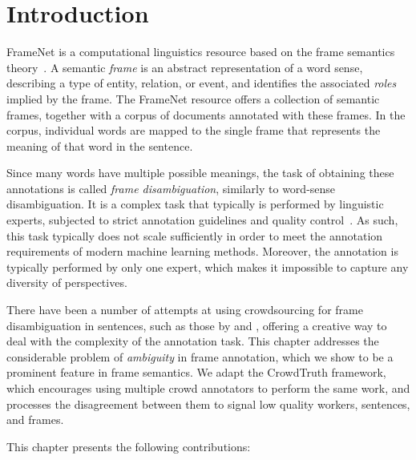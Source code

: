 \section{Introduction}

FrameNet is a computational linguistics resource based on the frame semantics theory~\cite{baker1998berkeley}. A semantic \textit{frame} is an abstract representation of a word sense, describing a type of entity, relation, or event, and identifies the associated \emph{roles} implied by the frame. The FrameNet resource offers a collection of semantic frames, together with a corpus of documents annotated with these frames. In the corpus, individual words are mapped to the single frame that represents the meaning of that word in the sentence.  

Since many words have multiple possible meanings, the task of obtaining these annotations is called \emph{frame disambiguation}, similarly to word-sense disambiguation.  It is a complex task that typically is performed by linguistic experts, subjected to strict annotation guidelines and quality control~\cite{baker2012framenet}. As such, this task typically does not scale sufficiently in order to meet the annotation requirements of modern machine learning methods. Moreover, the annotation is typically performed by only one expert, which makes it impossible to capture any diversity of perspectives.  

There have been a number of attempts at using crowdsourcing for frame disambiguation in sentences, such as those by \citet{Hong:2011:GCR:2018966.2018970} and \citet{chang2015scaling}, offering a creative way to deal with the complexity of the annotation task. This chapter addresses the considerable problem of \emph{ambiguity}  in frame annotation, which we show to be a prominent feature in frame semantics.  We adapt the CrowdTruth framework, which encourages using multiple crowd annotators to perform the same work, and processes the disagreement between them to signal low quality workers, sentences, and frames.

This chapter presents the following contributions:

